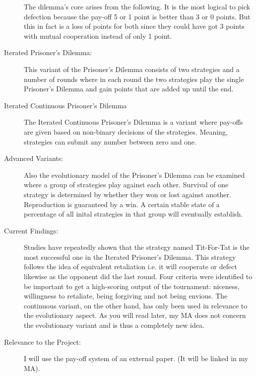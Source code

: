 \documentclass{article}
\begin{document}
\begin{description}
The dilemma's core arises from the following. It is the most logical to pick defection because the pay-off 5 or 1 point is better than 3 or 0 points. But this in fact is a loss of points for both since they could have got 3 points with mutual cooperation instead of only 1 point. 
		\item[Iterated Prisoner's Dilemma:] This variant of the Prisoner's Dilemma consists of two strategies and a number of rounds where in each round the two strategies play the single Prisoner's Dilemma and gain points that are added up until the end.
		\item[Iterated Continuous Prisoner's Dilemma] The Iterated Continuous Prisoner's Dilemma is a variant where pay-offs are given based on non-binary decisions of the strategies. Meaning, strategies can submit any number between zero and one.
		\item[Advanced Variants:]
Also the evolutionary model of the Prisoner's Dilemma can be examined where a group of strategies play against each other. Survival of one strategy is determined by whether they won or lost against another. Reproduction is guaranteed by a win. A certain stable state of a percentage of all inital strategies in that group will eventually establish.
		\item[Current Findings:] Studies have repeatedly shown that the strategy named Tit-For-Tat is the most successful one in the Iterated Prisoner's Dilemma. This strategy follows the idea of equivalent retaliation i.e. it will cooperate or defect likewise as the opponent did the last round. Four criteria were identified to be important to get a high-scoring output of the tournament: niceness, willingness to retaliate, being forgiving and not being envious. The continuous variant, on the other hand, has only been used in relevance to the evolutionary aspect. As you will read later, my MA does not concern the evolutionary variant and is thus a completely new idea.
		\item[Relevance to the Project:] I will use the pay-off system of an external paper. (It will be linked in my MA).  
	\end{description}
\end{document}
